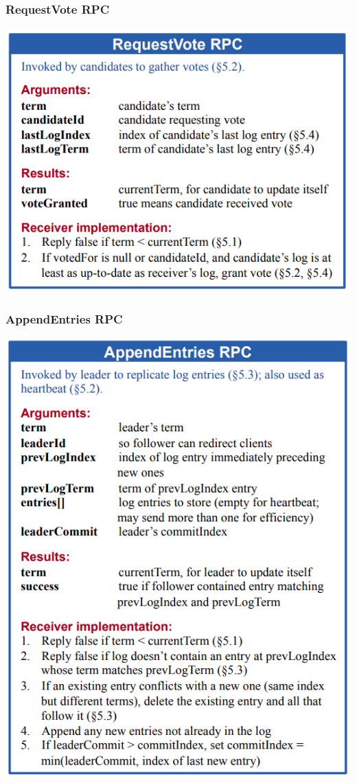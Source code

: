 \begin{frame}
    \frametitle{RequestVote RPC}
    \includegraphics[scale=0.3]{./figures/raft-requestvote.png}
\end{frame}

\begin{frame}
    \frametitle{AppendEntries RPC}
    \includegraphics[scale=0.3]{./figures/raft-appendentries.png}
\end{frame}

